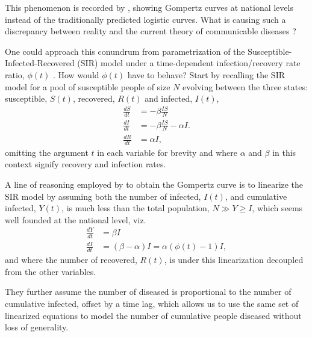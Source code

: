 \documentclass{article}
\newcommand{\insertSmallPdfFig}[3]{
  \begin{figure}[h]
  \centering
  \texttt{[image: \#1.pdf]}
  \caption{#2}
  \label{fig:#1}
  \end{figure}
}
\begin{document}

This phenomenon is recorded by \citep{Ohnishi2020,Rypdal2020,Catala2020,rodrigues2020monte,Levitt2020}, showing Gompertz curves at national levels instead of the traditionally predicted logistic curves. What is causing such a discrepancy between reality and the current theory of communicable diseases \citep{castro2020turning}?

One could approach this conundrum from parametrization of the Susceptible-Infected-Recovered (SIR) model under a time-dependent infection/recovery rate ratio, $\phi(t)$ \citep{kermack1927contribution}. How would $\phi(t)$ have to behave? Start by recalling the SIR model for a pool of susceptible people of size $N$ evolving between the three states: susceptible, $S(t)$, recovered, $R(t)$ and infected, $I(t)$,
\begin{align}
\label{eq:SIR}
\frac{dS}{dt}& = -\beta \frac{IS}{N}\\
\frac{dI}{dt}& = -\beta \frac{IS}{N} - \alpha I.\\
\frac{dR}{dt}& = \alpha I,
\end{align}
omitting the argument $t$ in each variable for brevity and where $\alpha$ and $\beta$ in this context signify recovery and infection rates.

A line of reasoning employed by \citet{Rypdal2020} to obtain the Gompertz curve is to linearize the SIR model by assuming
both the number of infected, $I(t)$, and cumulative infected, $Y(t)$, is much less than the total population, $N \gg Y \ge I$, which seems well founded at the national level, viz.
\begin{align}
\label{eq:linSIR}
\frac{dY}{dt}& = \beta I\\
\frac{dI}{dt}& = (\beta - \alpha) I = \alpha (\phi(t) - 1) I,
\end{align}
and where the number of recovered, $R(t)$, is under this linearization decoupled from the other variables. 

They further assume the number of diseased is proportional to the number of cumulative infected, offset by a time lag, which allows us to use the same set of linearized equations to model the number of cumulative people diseased without loss of generality.
\end{document}
